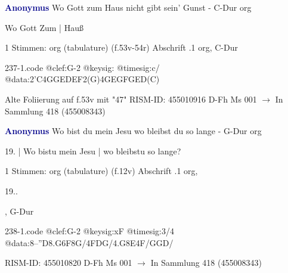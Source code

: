 \documentclass[twocolumn]{book}
\begin{document}
\newline \par \vspace{7pt} \textcolor{darkblue}{\textbf{Anonymus  }}
\newline Wo Gott zum Haus nicht gibt sein' Gunst - C-Dur
\newline org
\newline \begin{itshape}[f.53v, at left:] Wo Gott Zum | Hauß\end{itshape} 
\newline \textcolor{darkblue}{}  1 Stimmen: org (tabulature)  (f.53v-54r)
\newline Abschrift
.1  org, C-Dur  
\begin{filecontents*}{237-1.code}
@clef:G-2
@keysig:
@timesig:c/
@data:2'C4GGEDEF2(G)4GEGFGED(C)
\end{filecontents*}
\newline
%
\newline Alte Foliierung auf f.53v mit "47"
\newline RISM-ID: 455010916
\newline D-Fh  Ms 001
\newline $\rightarrow$ In Sammlung 418 (455008343)
      
\newline \par \vspace{7pt} \textcolor{darkblue}{\textbf{Anonymus  }}
\newline Wo bist du mein Jesu wo bleibst du so lange - G-Dur
\newline org
\newline \begin{itshape}[f.12v, at left:] 19. | Wo bistu mein Jesu | wo bleibstu so lange?\end{itshape} 
\newline \textcolor{darkblue}{}  1 Stimmen: org (tabulature)  (f.12v)
\newline Abschrift
.1  org, \begin{itshape}19..\end{itshape}, G-Dur  
\begin{filecontents*}{238-1.code}
@clef:G-2
@keysig:xF
@timesig:3/4
@data:8--''D{8.G6F8G}/4FDG/4.G8E4F/GGD/
\end{filecontents*}
\newline
%
\newline RISM-ID: 455010820
\newline D-Fh  Ms 001
\newline $\rightarrow$ In Sammlung 418 (455008343)
      
\end{document}
